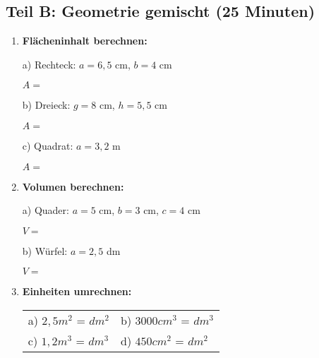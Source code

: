 \subsection*{Teil B: Geometrie gemischt (25 Minuten)}

\begin{enumerate}[label=\arabic*.]
    \item \textbf{Flächeninhalt berechnen:}
    \vspace{0.5cm}

    a) Rechteck: $a = 6,5$ cm, $b = 4$ cm

    $A = $ \underline{\hspace{4cm}}

    \vspace{0.5cm}

    b) Dreieck: $g = 8$ cm, $h = 5,5$ cm

    $A = $ \underline{\hspace{4cm}}

    \vspace{0.5cm}

    c) Quadrat: $a = 3,2$ m

    $A = $ \underline{\hspace{4cm}}

    \vspace{1cm}

    \item \textbf{Volumen berechnen:}
    \vspace{0.5cm}

    a) Quader: $a = 5$ cm, $b = 3$ cm, $c = 4$ cm

    $V = $ \underline{\hspace{4cm}}

    \vspace{0.5cm}

    b) Würfel: $a = 2,5$ dm

    $V = $ \underline{\hspace{4cm}}

    \vspace{1cm}

    \item \textbf{Einheiten umrechnen:}
    \vspace{0.5cm}

    \begin{tabular}{ll}
        a) $2,5 m^2$ = \underline{\hspace{3cm}} $dm^2$ & b) $3000 cm^3$ = \underline{\hspace{3cm}} $dm^3$ \\[2ex]
        c) $1,2 m^3$ = \underline{\hspace{3cm}} $dm^3$ & d) $450 cm^2$ = \underline{\hspace{3cm}} $dm^2$
    \end{tabular}

\end{enumerate}
